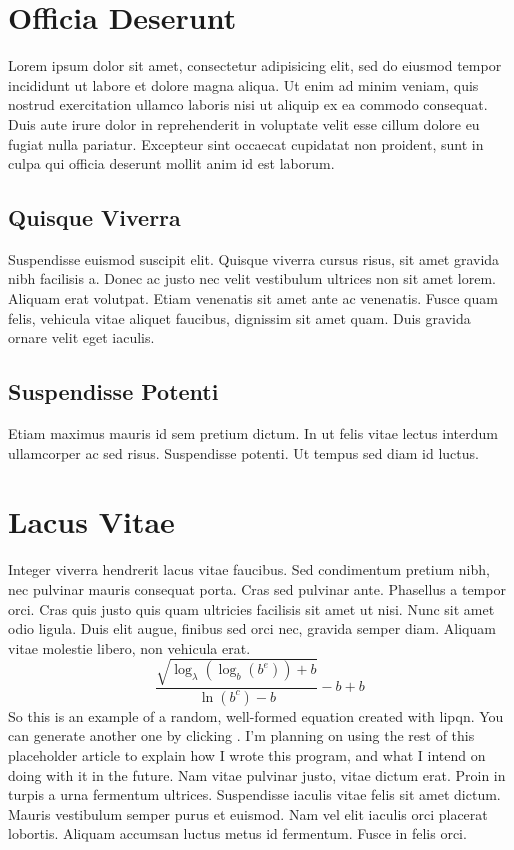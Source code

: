 \documentclass{article}
\begin{document}
\section{Officia Deserunt}
  Lorem ipsum dolor sit amet, consectetur adipisicing elit, sed do eiusmod tempor incididunt ut labore et dolore magna aliqua. Ut enim ad minim veniam, quis nostrud exercitation ullamco laboris nisi ut aliquip ex ea commodo consequat. Duis aute irure dolor in reprehenderit in voluptate velit esse cillum dolore eu fugiat nulla pariatur. Excepteur sint occaecat cupidatat non proident, sunt in culpa qui officia deserunt mollit anim id est laborum.
  \subsection{Quisque Viverra}
    Suspendisse euismod suscipit elit. Quisque viverra cursus risus, sit amet gravida nibh facilisis a. Donec ac justo nec velit vestibulum ultrices non sit amet lorem. Aliquam erat volutpat. Etiam venenatis sit amet ante ac venenatis. Fusce quam felis, vehicula vitae aliquet faucibus, dignissim sit amet quam. Duis gravida ornare velit eget iaculis.
  \subsection{Suspendisse Potenti}
    Etiam maximus mauris id sem pretium dictum. In ut felis vitae lectus interdum ullamcorper ac sed risus. Suspendisse potenti. Ut tempus sed diam id luctus.
\section{Lacus Vitae}
   Integer viverra hendrerit lacus vitae faucibus. Sed condimentum pretium nibh, nec pulvinar mauris consequat porta. Cras sed pulvinar ante. Phasellus a tempor orci. Cras quis justo quis quam ultricies facilisis sit amet ut nisi. Nunc sit amet odio ligula. Duis elit augue, finibus sed orci nec, gravida semper diam. Aliquam vitae molestie libero, non vehicula erat.
   $$
    \frac{\sqrt{\log_{\lambda}\left(\log_{b}\left(b^e\right)\right) + b}}{\ln \left(b^{c}\right) - b} - b + b
   $$
   So this is an example of a random, well-formed equation created with lipqn. You can generate another one by clicking \underline{\color{blue}{here}}. I'm planning on using the rest of this placeholder article to explain how I wrote this program, and what I intend on doing with it in the future. Nam vitae pulvinar justo, vitae dictum erat. Proin in turpis a urna fermentum ultrices. Suspendisse iaculis vitae felis sit amet dictum. Mauris vestibulum semper purus et euismod. Nam vel elit iaculis orci placerat lobortis. Aliquam accumsan luctus metus id fermentum. Fusce in felis orci.
\end{document}
